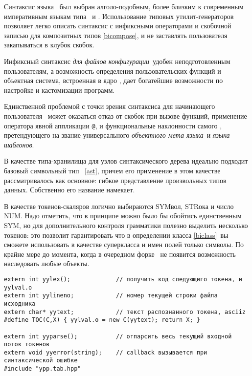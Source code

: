\secdown

Синтаксис языка \bi\ был выбран алголо-подобным, более близким к современным
императивным языкам типа \cpp\ и \py. Использование типовых утилит-генераторов
позволяет легко описать синтаксис с инфиксными операторами и скобочной записью
для композитных типов\,\ref{bicompose}, и не заставлять пользователя
закапываться в клубок  скобок.

Инфиксный синтаксис \emph{для файлов конфигурации}\ удобен неподготовленным
пользователям, а возможность определения пользовательских функций и объектная
система, встроенная в ядро \bi, дает богатейшие возможности по настройке
и кастомизации программ.

Единственной проблемой с точки зрения синтаксиса для начинающего пользователя
\bi\ может оказаться отказ от скобок при вызове функций, применение оператора
явной аппликации \verb|@|, и функциональные наклонности самого \bi,
претендующего на звание универсального \emph{объектного мета-языка}\ и
\emph{языка шаблонов}.

\label{bilexer}


\label{biparser}


В качестве типа-хранилища для узлов синтаксического дерева идеально подходит
базовый символьный тип \bi\ \ref{ast}, причем его применение в этом качестве
рассматривалось как основное: гибкое представление произвольных типов данных.
Собственно его название намекает.

В качестве токенов-скаляров логично выбираются SYMвол, STRока и число
NUM. Надо
отметить, что в принципе можно было бы обойтись единственным SYM, но для
дополнительного контроля грамматики полезно выделить несколько токенов: это
позволит гарантировать что в определении класса \ref{biclass}\ вы сможете
использовать в качестве суперкласса и имен полей только символы. По крайне мере
до момента, когда в очередном форке \bi\ не появится возможность наследовать
любые объекты.


\begin{verbatim}
extern int yylex();             // получить код следующиго токена, и yylval.o 
extern int yylineno;            // номер текущей строки файла исходника
extern char* yytext;            // текст распознанного токена, asciiz
#define TOC(C,X) { yylval.o = new C(yytext); return X; }

extern int yyparse();           // отпарсить весь текущий входной поток токенов
extern void yyerror(string);    // callback вызывается при синтаксической ошибке
#include "ypp.tab.hpp"
\end{verbatim}

\secup

